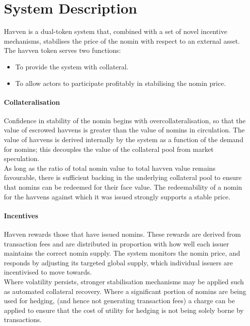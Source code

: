\section{System Description} Havven is a dual-token system that, combined with a set of novel incentive mechanisms, stabilises the price of the nomin with respect to an external asset. \\

\noindent The havven token serves two functions:

\begin{itemize}
\item{To provide the system with collateral.}
\item{To allow actors to participate profitably in stabilising the nomin price.}
\end{itemize}

\paragraph{Collateralisation}

\noindent Confidence in stability of the nomin begins with overcollateralisation, so that the value of escrowed havvens is greater than the value of nomins in circulation. The value of havvens is derived internally by the system as a function of the demand for nomins; this decouples the value of the collateral pool from market speculation. \\

\noindent As long as the ratio of total nomin value to total havven value remains favourable, there is sufficient backing in the underlying collateral pool to ensure that nomins can be redeemed for their face value. The redeemability of a nomin for the havvens against which it was issued strongly supports a stable price.  

\paragraph{Incentives}

\noindent Havven rewards those that have issued nomins. These rewards are derived from transaction fees and are distributed in proportion with how well each issuer maintains the correct nomin supply. The system monitors the nomin price, and responds by adjusting its targeted global supply, which individual issuers are incentivised to move towards. \\

\noindent Where volatility persists, stronger stabilisation mechanisms may be applied such as automated collateral recovery. Where a significant portion of nomins are being used for hedging, (and hence not generating transaction fees) a charge can be applied to ensure that the cost of utility for hedging is not being solely borne by transactions.

